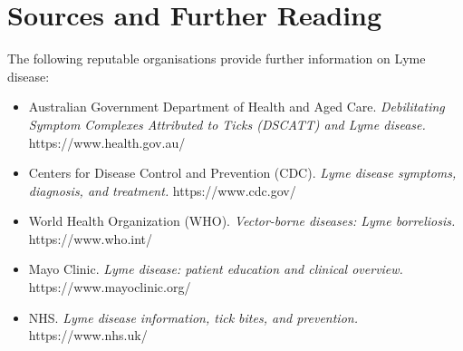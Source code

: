 \section*{Sources and Further Reading}
The following reputable organisations provide further information on Lyme disease:
\begin{itemize}
    \item Australian Government Department of Health and Aged Care. \textit{Debilitating Symptom Complexes Attributed to Ticks (DSCATT) and Lyme disease.} https://www.health.gov.au/
    \item Centers for Disease Control and Prevention (CDC). \textit{Lyme disease symptoms, diagnosis, and treatment.} https://www.cdc.gov/
    \item World Health Organization (WHO). \textit{Vector-borne diseases: Lyme borreliosis.} https://www.who.int/
    \item Mayo Clinic. \textit{Lyme disease: patient education and clinical overview.} https://www.mayoclinic.org/
    \item NHS. \textit{Lyme disease information, tick bites, and prevention.} https://www.nhs.uk/
\end{itemize}
